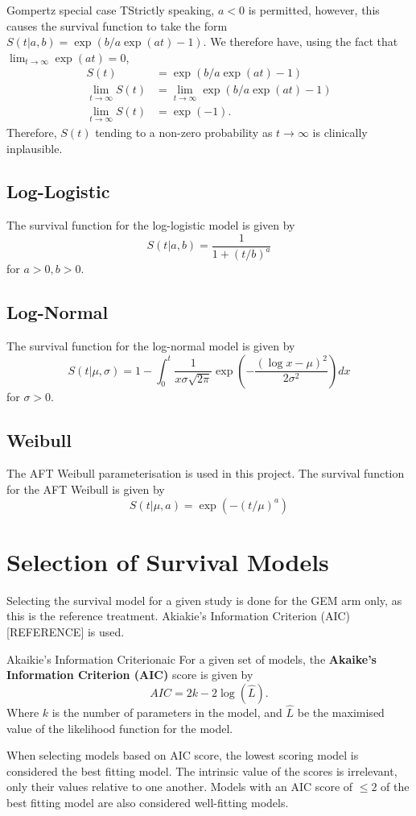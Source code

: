 \begin{remark}{Gompertz special case}
    TStrictly speaking, $a < 0$ is permitted, however, this causes the survival function to take the form $S(t|a,b) = \exp(b/a\exp(at)-1)$. We therefore have, using the fact that $\lim_{t \to \infty} \exp(at) = 0$,
    \begin{align*}
        S(t) &= \exp(b/a\exp(at)-1) \\
        \lim_{t \to \infty} S(t) &= \lim_{t \to \infty} \exp(b/a\exp(at)-1) \\
        \lim_{t \to \infty} S(t) &= \exp(-1).
    \end{align*}
    Therefore, $S(t)$ tending to a non-zero probability as $t \to \infty$ is clinically inplausible.
\end{remark}

\subsection{Log-Logistic}
The survival function for the log-logistic model is given by \[S(t|a,b) = \frac{1}{1+(t/b)^a}\] for $a > 0, b > 0$.

\subsection{Log-Normal}
The survival function for the log-normal model is given by \[S(t|\mu, \sigma) = 1 - \int_{0}^{t} \frac{1}{x\sigma\sqrt{2\pi}}\exp\left(-\frac{(\log x - \mu)^2}{2\sigma^2} \right)dx \] for $\sigma > 0$.

\subsection{Weibull}
The AFT Weibull parameterisation is used in this project. The survival function for the AFT Weibull is given by \[S(t|\mu,a)=\exp(-(t/\mu)^a)\]

\section{Selection of Survival Models}\label{model_selction}
Selecting the survival model for a given study is done for the GEM arm only, as this is the reference treatment. Akiakie's Information Criterion (AIC) [REFERENCE] is used.

\begin{definition}{Akaikie's Information Criterion}{aic}
    For a given set of models, the \textbf{Akaike's Information Criterion (AIC)} score is given by 
    \[
     AIC = 2k - 2\log(\hat{L}).   
    \]
    Where $k$ is the number of parameters in the model, and $\hat{L}$ be the maximised value of the likelihood function for the model.
\end{definition}

When selecting models based on AIC score, the lowest scoring model is considered the best fitting model. The intrinsic value of the scores is irrelevant, only their values relative to one another. Models with an AIC score of $\leq 2$ of the best fitting model are also considered well-fitting models.